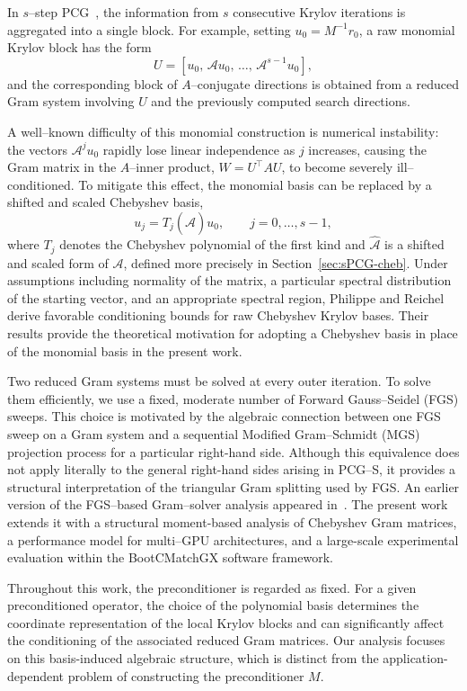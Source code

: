 \documentclass[pdflatex,sn-mathphys-num]{sn-jnl}%
\begin{document}
In $s$--step PCG~\cite{ChronGear1989p,ChronGear1989}, the information from
$s$ consecutive Krylov iterations is aggregated into a single block.
For example, setting $u_0=M^{-1}r_0$, a raw monomial Krylov block has
the form
\[
U=
\left[
u_0,\,
\mathcal{A}u_0,\,
\dots,\,
\mathcal{A}^{s-1}u_0
\right],
\]
and the corresponding block of $A$--conjugate directions is obtained from
a reduced Gram system involving $U$ and the previously computed search
directions.

A well--known difficulty of this monomial construction is numerical
instability: the vectors $\mathcal{A}^j u_0$ rapidly lose linear
independence as $j$ increases, causing the Gram matrix in the $A$--inner
product, $W = U^\top A U$, to become severely ill--conditioned.
To mitigate this effect, the
monomial basis can be replaced by a shifted and scaled Chebyshev
basis,
\[
u_j=T_j(\widehat{\mathcal{A}})u_0,
\qquad
j=0,\dots,s-1,
\]
where $T_j$ denotes the Chebyshev polynomial of the first kind and
$\widehat{\mathcal{A}}$ is a shifted and scaled form of
$\mathcal{A}$, defined more precisely in
Section~\ref{sec:sPCG-cheb}.
Under assumptions including normality of the matrix, a particular
spectral distribution of the starting vector, and an appropriate
spectral region, Philippe and Reichel~\cite{Reichel2012} derive
favorable conditioning bounds for raw Chebyshev Krylov bases. Their
results provide the theoretical motivation for adopting a Chebyshev
basis in place of the monomial basis in the present work.

Two reduced Gram systems must be solved at every outer iteration.
To solve them efficiently, we use a fixed, moderate number of Forward
Gauss--Seidel (FGS) sweeps. This choice is motivated by the algebraic connection between one FGS
sweep on a Gram system and a sequential Modified Gram--Schmidt (MGS)
projection process for a particular right-hand side. Although this
equivalence does not apply literally to the general right-hand sides
arising in PCG--S, it provides a structural interpretation of the
triangular Gram splitting used by FGS.
An earlier version of the FGS--based Gram--solver analysis appeared in~\cite{ThomasDAmbra2025}. The present work extends it with a structural moment-based analysis of
Chebyshev Gram matrices, a performance model for multi--GPU architectures,
and a large-scale experimental evaluation within the BootCMatchGX
software framework.

Throughout this work, the preconditioner is regarded
as fixed. For a given preconditioned operator, the choice of the
polynomial basis determines the coordinate representation of the
local Krylov blocks and can significantly affect the conditioning of
the associated reduced Gram matrices. Our analysis focuses on this
basis-induced algebraic structure, which is distinct from the
application-dependent problem of constructing the preconditioner
$M$.
\end{document}
